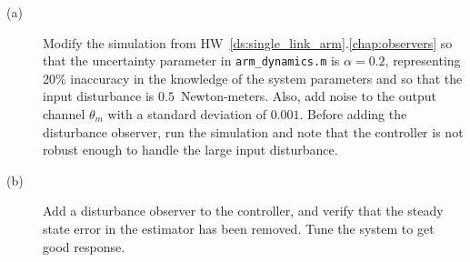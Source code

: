 \begin{description}
\item[(a)] Modify the simulation from HW~\ref{ds:single_link_arm}.\ref{chap:observers} so that the uncertainty parameter in {\tt  arm\_dynamics.m} is $\alpha=0.2$, representing 20\% inaccuracy in the knowledge of the system parameters and so that the input disturbance is $0.5$~Newton-meters. Also, add noise to the output channel $\theta_m$ with a standard deviation of $0.001$.  Before adding the disturbance observer, run the simulation and note that the controller is not robust enough to handle the large input disturbance.
\item[(b)] Add a disturbance observer to the controller, and verify that the steady state error in the estimator has been removed.  Tune the system to get good response.
\end{description}

